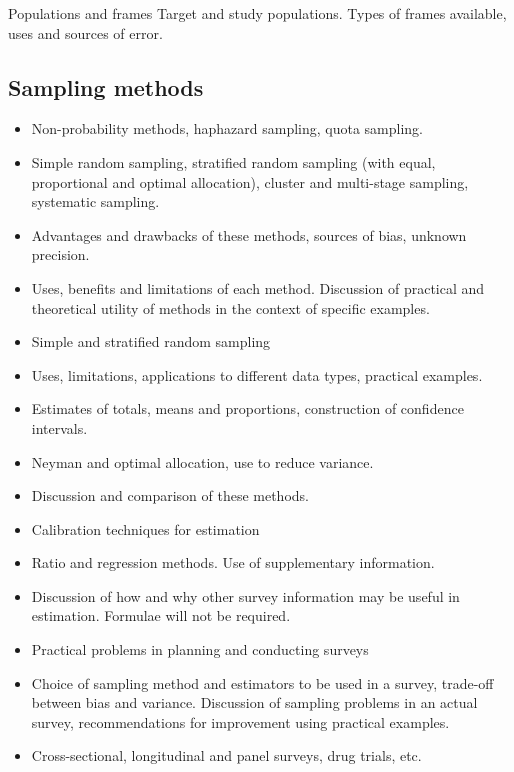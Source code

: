 Populations and frames
Target and study populations. Types of frames available, uses and sources of error.
\subsection*{Sampling methods}
\begin{itemize}
\item	Non-probability methods, haphazard sampling, quota sampling.
\item	Simple random sampling, stratified random sampling (with equal, proportional and optimal allocation), cluster and multi-stage sampling, systematic sampling.
\item	Advantages and drawbacks of these methods, sources of bias, unknown precision.
\item	Uses, benefits and limitations of each method. Discussion of practical and theoretical utility of methods in the context of specific examples.
\item	Simple and stratified random sampling
\item	Uses, limitations, applications to different data types, practical examples.
\item	Estimates of totals, means and proportions, construction of confidence intervals.
\item	Neyman and optimal allocation, use to reduce variance.
\item	Discussion and comparison of these methods.
\item	Calibration techniques for estimation
\item	Ratio and regression methods. Use of supplementary information.
\item	Discussion of how and why other survey information may be useful in estimation. Formulae will not be required.
\item	Practical problems in planning and conducting surveys
\item	Choice of sampling method and estimators to be used in a survey, trade-off between bias and variance. Discussion of sampling problems in an actual survey, recommendations for improvement using practical examples.
\item	Cross-sectional, longitudinal and panel surveys, drug trials, etc.
\end{itemize}
